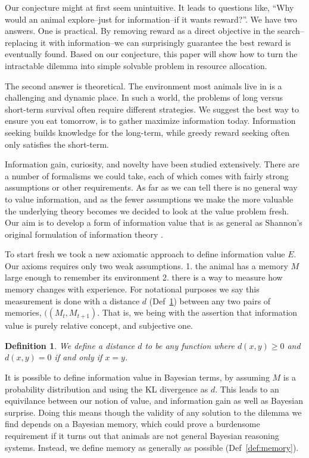 \documentclass[9pt,twocolumn,twoside]{pnas-new}
\newtheorem{definition}{Definition}
\begin{document}
Our conjecture might at first seem unintuitive. It leads to questions like, ``Why would an animal explore--just for information--if it wants reward?''. We have two answers. One is practical. By removing reward as a direct objective in the search--replacing it with information--we can surprisingly guarantee the best reward is eventually found. Based on our conjecture, this paper will show how to turn the intractable dilemma into simple solvable problem in resource allocation. 

The second answer is theoretical.  The environment most animals live in is a challenging and dynamic place. In such a world, the problems of long versus short-term survival often require different strategies. We suggest the best way to ensure you eat tomorrow, is to gather maximize information today. Information seeking builds knowledge for the long-term, while greedy reward seeking often only satisfies the short-term.

Information gain, curiosity, and novelty have been studied extensively. There are a number of formalisms we could take, each of which comes with fairly strong assumptions or other requirements. As far as we can tell there is no general way to value information, and as the fewer assumptions we make the more valuable the underlying theory becomes we decided to look at the value problem fresh. Our aim is to develop a form of information value that is as general as Shannon's original formulation of information theory \cite{Shannon1948}.

To start fresh we took a new axiomatic approach to define information value $E$. Our axioms requires only two weak assumptions. 1. the animal has a memory $M$ large enough to remember its environment 2. there is a way to measure how memory changes with experience. For notational purposes we say this measurement is done with a distance $d$ (Def~\ref{def:distance}) between any two pairs of memories, $((M_{t}, M_{t+1})$. That is, we being with the assertion that information value is purely relative concept, and subjective one.

\begin{definition}
    \label{def:distance}
    We define a distance $d$ to be any function where $d(x,y) \geq 0$ and $d(x,y) = 0$ if and only if $x = y$.
\end{definition}

It is possible to define information value in Bayesian terms, by assuming $M$ is a probability distribution and using the KL divergence as $d$. This leads to an equivilance between our notion of value, and information gain as well as Bayesian surprise. Doing this means though the validity of any solution to the dilemma we find depends on a Bayesian memory, which could prove a burdensome requirement if it turns out that animals are not general Bayesian reasoning systems. Instead, we define memory as generally as possible (Def~\ref{def:memory}). 
\end{document}
